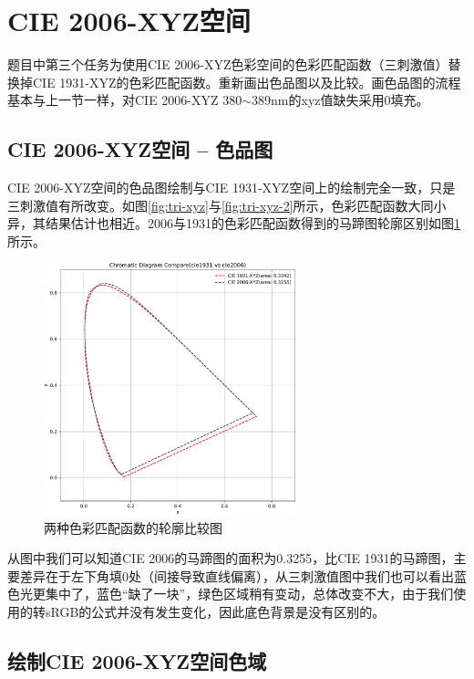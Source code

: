 \section{CIE 2006-XYZ空间}
题目中第三个任务为使用CIE 2006-XYZ色彩空间的色彩匹配函数（三刺激值）替换掉CIE 1931-XYZ的色彩匹配函数。重新画出色品图以及比较。画色品图的流程基本与上一节一样，对CIE 2006-XYZ 380$\sim$389nm的xyz值缺失采用0填充。

\subsection{CIE 2006-XYZ空间 -- 色品图}

CIE 2006-XYZ空间的色品图绘制与CIE 1931-XYZ空间上的绘制完全一致，只是三刺激值有所改变。如图\ref{fig:tri-xyz}与\ref{fig:tri-xyz-2}所示，色彩匹配函数大同小异，其结果估计也相近。2006与1931的色彩匹配函数得到的马蹄图轮廓区别如图\ref{fig:cmp-sd}所示。

\begin{figure}[htbp]
    \centering
    \includegraphics[width=0.65\textwidth]{./imgs/sec4/cmp-sd.pdf}
    \caption{两种色彩匹配函数的轮廓比较图}
    \label{fig:cmp-sd}
\end{figure}

从图中我们可以知道CIE 2006的马蹄图的面积为0.3255，比CIE 1931的马蹄图，主要差异在于左下角填0处（间接导致直线偏离），从三刺激值图中我们也可以看出蓝色光更集中了，蓝色``缺了一块''，绿色区域稍有变动，总体改变不大，由于我们使用的转sRGB的公式并没有发生变化，因此底色背景是没有区别的。

\subsection{绘制CIE 2006-XYZ空间色域}


